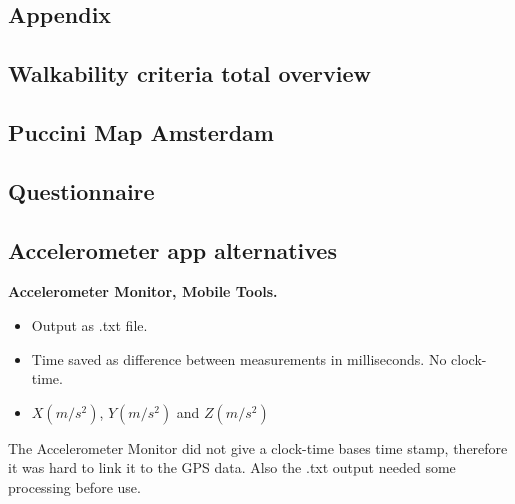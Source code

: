 
\begin{appendix}
\chapter{Appendix}

\section{Walkability criteria total overview}\label{Acriteria}






\section{Puccini Map Amsterdam}
\label{pucciniMap}

\clearpage

\section{Questionnaire}\label{Aquest}


\clearpage

\section{Accelerometer app alternatives}\label{Aapps}
\textbf{Accelerometer Monitor, Mobile Tools.}
\begin{itemize}
\item Output as .txt file. 
\item Time saved as difference between measurements in milliseconds. No clock-time.
\item $X(m/s^2)$, $Y(m/s^2)$ and $Z(m/s^2)$
\end{itemize}
The Accelerometer Monitor did not give a clock-time bases time stamp, therefore it was hard to link it to the GPS data. Also the .txt output needed some processing before use. 


\end{appendix}
